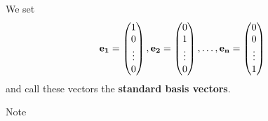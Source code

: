 \begin{definition}
    We set
    \[
        \bf{e}_1=
        \begin{pmatrix}
            1\\
            0\\
            \vdots\\
            0\\
        \end{pmatrix}
        ,\bf{e}_2=
        \begin{pmatrix}
            0\\
            1\\
            \vdots\\
            0\\
        \end{pmatrix}
        ,\ldots,\bf{e}_n=
        \begin{pmatrix}
            0\\
            0\\
            \vdots\\
            1\\
        \end{pmatrix}
    \]
    and call these vectors the \textbf{standard basis vectors}.
\end{definition}

Note

